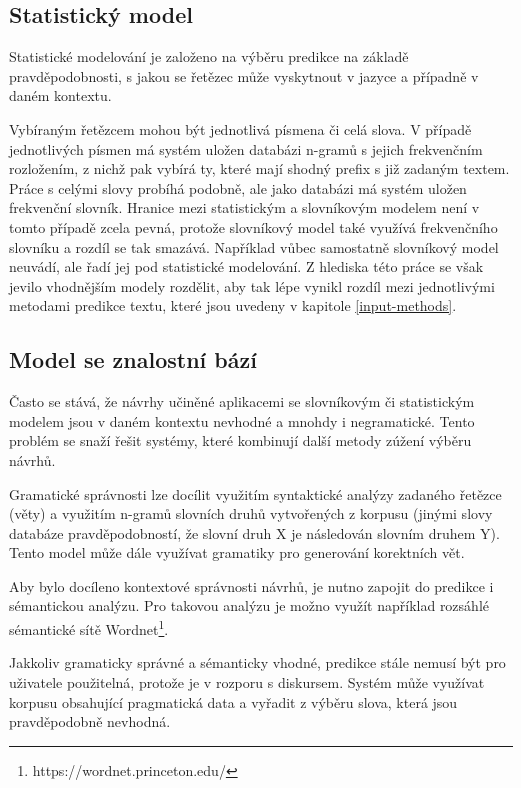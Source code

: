 \documentclass[a4paper,11pt]{article}
\begin{document}
\subsection{Statistický model}

Statistické modelování je založeno na výběru predikce na základě pravděpodobnosti, s jakou se řetězec může vyskytnout v jazyce a případně v daném kontextu. \parencite[5233]{ghayoomi2009overview}

Vybíraným řetězcem mohou být jednotlivá písmena či celá slova. V případě jednotlivých písmen má systém uložen databázi n-gramů s jejich frekvenčním rozložením, z nichž pak vybírá ty, které mají shodný prefix s již zadaným textem. Práce s celými slovy probíhá podobně, ale jako databázi má systém uložen frekvenční slovník. Hranice mezi statistickým a slovníkovým modelem není v tomto případě zcela pevná, protože slovníkový model také využívá frekvenčního slovníku a rozdíl se tak smazává. Například \parencite{ghayoomi2009overview} vůbec samostatně slovníkový model neuvádí, ale řadí jej pod statistické modelování. Z hlediska této práce se však jevilo vhodnějším modely rozdělit, aby tak lépe vynikl rozdíl mezi jednotlivými metodami predikce textu, které jsou uvedeny v kapitole \ref{input-methods}.

\subsection{Model se znalostní bází}

Často se stává, že návrhy učiněné aplikacemi se slovníkovým či statistickým modelem jsou v daném kontextu nevhodné a mnohdy i negramatické. Tento problém se snaží řešit systémy, které kombinují další metody zúžení výběru návrhů. 

Gramatické správnosti lze docílit využitím syntaktické analýzy zadaného řetězce (věty) a využitím n-gramů slovních druhů vytvořených z korpusu (jinými slovy databáze pravděpodobností, že slovní druh X je následován slovním druhem Y). Tento model může dále využívat gramatiky pro generování korektních vět. \parencite[5234-5235]{ghayoomi2009overview}

Aby bylo docíleno kontextové správnosti návrhů, je nutno zapojit do predikce i sémantickou analýzu. Pro takovou analýzu je možno využít například rozsáhlé sémantické sítě Wordnet\footnote{https://wordnet.princeton.edu/}. \parencite[5235]{ghayoomi2009overview}

Jakkoliv gramaticky správné a sémanticky vhodné, predikce stále nemusí být pro uživatele použitelná, protože je v rozporu s diskursem. Systém může využívat korpusu obsahující pragmatická data a vyřadit z výběru slova, která jsou pravděpodobně nevhodná. \parencite[5235]{ghayoomi2009overview}
\end{document}
